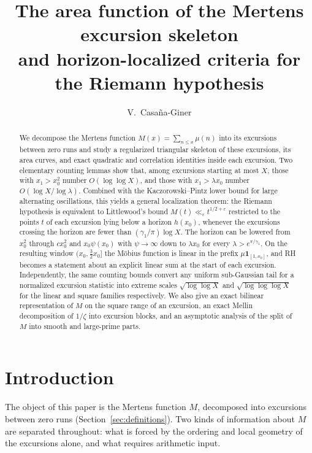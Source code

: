 \documentclass[11pt]{amsart}
\title[The Mertens excursion skeleton]{The area function of the Mertens excursion skeleton\\
and horizon-localized criteria for the Riemann hypothesis}
\author{V.~Casa\~na-Giner}
\date{}
\numberwithin{equation}{section}
\theoremstyle{plain}
\theoremstyle{definition}
\theoremstyle{remark}
\newcommand{\eps}{\varepsilon}
\begin{document}
\begin{abstract}
We decompose the Mertens function $M(x)=\sum_{n\le x}\mu(n)$ into its
excursions between zero runs and study a regularized triangular skeleton of
these excursions, its area curves, and exact quadratic and correlation
identities inside each excursion. Two elementary counting lemmas show that,
among excursions starting at most $X$, those with $x_1>x_0^2$ number
$O(\log\log X)$, and those with $x_1>\lambda x_0$ number
$O(\log X/\log\lambda)$. Combined with the Kaczorowski--Pintz lower bound for
large alternating oscillations, this yields a general localization theorem:
the Riemann hypothesis is equivalent to Littlewood's bound
$M(t)\ll_\eps t^{1/2+\eps}$ restricted to the points $t$ of each excursion
lying below a horizon $h(x_0)$, whenever the excursions crossing the horizon
are fewer than $(\gamma_1/\pi)\log X$. The horizon can be lowered from
$x_0^2$ through $cx_0^2$ and $x_0\psi(x_0)$ with $\psi\to\infty$ down to
$\lambda x_0$ for every $\lambda>e^{\pi/\gamma_1}$. On the resulting window
$(x_0,\frac32x_0]$ the M\"obius function is linear in the prefix
$\mu\mathbf 1_{[1,x_0]}$, and RH becomes a statement about an explicit
linear sum at the start of each excursion. Independently, the same
counting bounds convert any uniform sub-Gaussian tail for a normalized
excursion statistic into extreme scales $\sqrt{\log\log X}$ and
$\sqrt{\log\log\log X}$ for the linear and square families respectively. We
also give an exact bilinear representation of $M$ on the square range of an
excursion, an exact Mellin decomposition of $1/\zeta$ into excursion blocks,
and an asymptotic analysis of the split of $M$ into smooth and large-prime
parts.
\end{abstract}

\maketitle

\tableofcontents

\section{Introduction}
\label{sec:introduction}

The object of this paper is the Mertens function $M$, decomposed into
excursions between zero runs (Section~\ref{sec:definitions}). Two kinds of
information about $M$ are separated throughout: what is forced by the
ordering and local geometry of the excursions alone, and what requires
arithmetic input.
\end{document}
